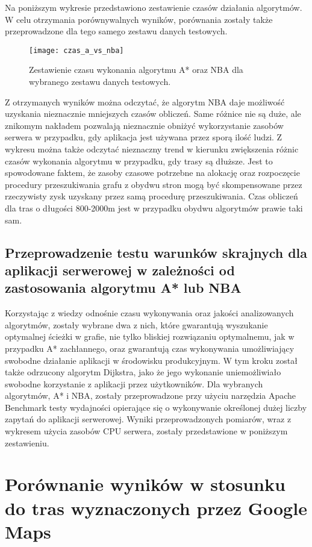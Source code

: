 Na poniższym wykresie przedstawiono zestawienie czasów działania algorytmów. W celu otrzymania porównywalnych wyników, porównania zostały także przeprowadzone dla tego samego zestawu danych testowych.

\begin{figure}[H]
\centering
\texttt{[image: czas\_a\_vs\_nba]}
\caption{Zestawienie czasu wykonania algorytmu A* oraz NBA dla wybranego zestawu danych testowych.}
\end{figure}

Z otrzymanych wyników można odczytać, że algorytm NBA daje możliwość uzyskania nieznacznie mniejszych czasów obliczeń. Same różnice nie są duże, ale znikomym nakładem pozwalają nieznacznie obniżyć wykorzystanie zasobów serwera w przypadku, gdy aplikacja jest używana przez sporą ilość ludzi. Z wykresu można także odczytać nieznaczny trend w kierunku zwiększenia różnic czasów wykonania algorytmu w przypadku, gdy trasy są dłuższe. Jest to spowodowane faktem, że zasoby czasowe potrzebne na alokację oraz rozpoczęcie procedury przeszukiwania grafu z obydwu stron mogą być skompensowane przez rzeczywisty zysk uzyskany przez samą procedurę przeszukiwania. Czas obliczeń dla tras o długości 800-2000m jest w przypadku obydwu algorytmów prawie taki sam.

\subsection{Przeprowadzenie testu warunków skrajnych dla aplikacji serwerowej w zależności od zastosowania algorytmu A* lub NBA}

Korzystając z wiedzy odnośnie czasu wykonywania oraz jakości analizowanych algorytmów, zostały wybrane dwa z nich, które gwarantują wyszukanie optymalnej ścieżki w grafie, nie tylko bliskiej rozwiązaniu optymalnemu, jak w przypadku A* zachłannego, oraz gwarantują czas wykonywania umożliwiający swobodne działanie aplikacji w środowisku produkcyjnym. W tym kroku został także odrzucony algorytm Dijkstra, jako że jego wykonanie uniemożliwiało swobodne korzystanie z aplikacji przez użytkowników. Dla wybranych algorytmów, A* i NBA, zostały przeprowadzone przy użyciu narzędzia Apache Benchmark testy wydajności opierające się o wykonywanie określonej dużej liczby zapytań do aplikacji serwerowej. Wyniki przeprowadzonych pomiarów, wraz z wykresem użycia zasobów CPU serwera, zostały przedstawione w poniższym zestawieniu.

\section{Porównanie wyników w stosunku do tras wyznaczonych przez Google Maps}

